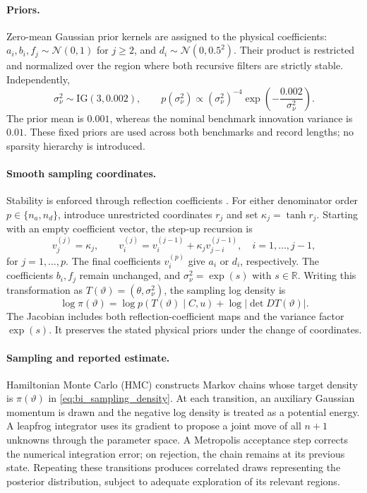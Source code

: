 \documentclass[11pt]{article}
\begin{document}
\paragraph{Priors.}
Zero-mean Gaussian prior kernels are assigned to the physical coefficients:
$a_i,b_i,f_j\sim\mathcal N(0,1)$ for $j\geq2$, and
$d_i\sim\mathcal N(0,0.5^2)$. Their product is restricted and normalized
over the region where both recursive filters are strictly stable.
Independently,
\begin{equation}
\label{eq:bi_variance_prior}
 \sigma_\nu^2\sim\mathrm{IG}(3,0.002),\qquad
 p(\sigma_\nu^2)\propto
 (\sigma_\nu^2)^{-4}\exp\!\left(-\frac{0.002}{\sigma_\nu^2}\right).
\end{equation}
The prior mean is $0.001$, whereas the nominal benchmark innovation
variance is $0.01$. These fixed priors are used across both benchmarks and record
lengths; no sparsity hierarchy is introduced.

\paragraph{Smooth sampling coordinates.}
Stability is enforced through reflection coefficients
\cite{Monahan1984}. For either denominator order $p\in\{n_a,n_d\}$,
introduce unrestricted coordinates $r_j$ and set $\kappa_j=\tanh r_j$.
Starting with an empty coefficient vector, the step-up recursion is
\begin{equation}
\label{eq:bi_schur}
 v_j^{(j)}=\kappa_j,\qquad
 v_i^{(j)}=v_i^{(j-1)}+\kappa_j v_{j-i}^{(j-1)},
 \quad i=1,\ldots,j-1,
\end{equation}
for $j=1,\ldots,p$. The final coefficients $v_i^{(p)}$ give $a_i$
or $d_i$, respectively. The coefficients $b_i,f_j$ remain unchanged,
and $\sigma_\nu^2=\exp(s)$ with $s\in\mathbb R$.
Writing this transformation as
$T(\vartheta)=(\theta,\sigma_\nu^2)$, the sampling log density is
\begin{equation}
\label{eq:bi_sampling_density}
 \log\pi(\vartheta)
 =\log p\!\left(T(\vartheta)\mid C,u\right)
   +\log|\det DT(\vartheta)|.
\end{equation}
The Jacobian includes both reflection-coefficient maps and the variance
factor $\exp(s)$. It preserves the stated physical priors under the
change of coordinates.

\paragraph{Sampling and reported estimate.}
Hamiltonian Monte Carlo (HMC) \cite{Neal2011} constructs Markov chains
whose target density is $\pi(\vartheta)$ in
\eqref{eq:bi_sampling_density}. At each transition, an auxiliary Gaussian
momentum is drawn and the negative log density is treated as a potential
energy. A leapfrog integrator uses its gradient to propose a joint move
of all $n+1$ unknowns through the parameter space. A Metropolis
acceptance step corrects the numerical integration error; on rejection,
the chain remains at its previous state. Repeating these transitions
produces correlated draws representing the posterior distribution,
subject to adequate exploration of its relevant regions.
\end{document}
